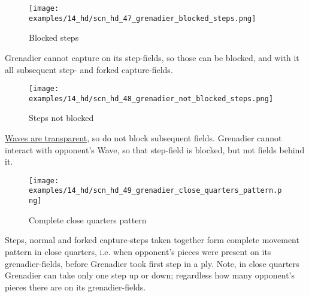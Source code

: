 \clearpage %

\vspace*{-1.7\baselineskip}
\noindent
\begin{wrapfigure}[4]{l}{0.41\textwidth}
\centering
\texttt{[image: examples/14\_hd/scn\_hd\_47\_grenadier\_blocked\_steps.png]}
\vspace*{-0.5\baselineskip}
\caption{Blocked steps}
\label{fig:scn_hd_47_grenadier_blocked_steps}
\end{wrapfigure}
Grenadier cannot capture on its step-fields, so those can be blocked, and with it
all subsequent step- and forked capture-fields.


\vspace*{2.3\baselineskip}
\noindent
\begin{wrapfigure}[5]{l}{0.41\textwidth}
\centering
\texttt{[image: examples/14\_hd/scn\_hd\_48\_grenadier\_not\_blocked\_steps.png]}
\vspace*{-0.5\baselineskip}
\caption{Steps not blocked}
\label{fig:scn_hd_48_grenadier_not_blocked_steps}
\end{wrapfigure}
\hyperref[fig:scn_mv_011_wave_is_transparent]{Waves are transparent}, so do not block
subsequent fields. Grenadier cannot interact with opponent's Wave, so that step-field
is blocked, but not fields behind it.

\vspace*{1.0\baselineskip}
\noindent
\begin{figure}[!h]
\texttt{[image: examples/14\_hd/scn\_hd\_49\_grenadier\_close\_quarters\_pattern.png]}
\vspace*{-1.3\baselineskip}
\caption{Complete close quarters pattern}
\label{fig:scn_hd_49_grenadier_close_quarters_pattern}
\end{figure}

\vspace*{-0.5\baselineskip}
Steps, normal and forked capture-steps taken together form complete movement pattern
in close quarters, i.e. when opponent's pieces were present on its grenadier-fields,
before Grenadier took first step in a ply.\newline
\indent
Note, in close quarters Grenadier can take only one step up or down; regardless how
many opponent's pieces there are on its grenadier-fields.

